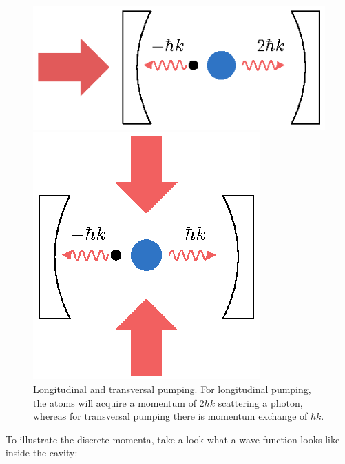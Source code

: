 \begin{figure}[!htb]
	\begin{minipage}[b]{.5\linewidth}
	\centering
	\includegraphics[width=.8\linewidth]{images/pump_long.eps}
	\end{minipage}
%
	\begin{minipage}[b]{.5\linewidth}
	\centering
	\includegraphics[width=.8\linewidth]{images/pump_trans.eps}
	\end{minipage}
\caption{Longitudinal and transversal pumping. For longitudinal pumping, the atoms will acquire a momentum of $2\hbar k$ scattering a photon, whereas for transversal pumping there is momentum exchange of $\hbar k$.}
\label{pumping}
\end{figure}
\FloatBarrier

\noindent To illustrate the discrete momenta, take a look what a wave function looks like inside the cavity:

